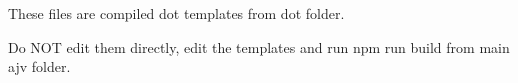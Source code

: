 These files are compiled dot templates from dot folder.

Do N\+OT edit them directly, edit the templates and run {\ttfamily npm run build} from main ajv folder. 